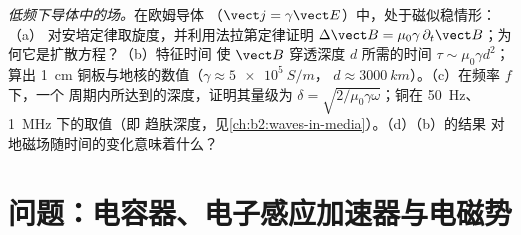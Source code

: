 \begin{exercise}[$\star\star\star$]\label{exo:b2:maxwell-equations:12}
\emph{低频下导体中的场。}在欧姆导体
（$\vect j = \gamma\vect E$）中，处于磁似稳情形：（a）
对安培定律取旋度，并利用法拉第定律证明 $\Delta\vect B = \mu_0\gamma\,
\partial_t\vect B$；为何它是扩散方程？（b）特征时间
使 $\vect B$ 穿透深度 $d$ 所需的时间 $\tau \sim \mu_0\gamma d^2$；算出
\qty{1}{cm} 铜板与地核的数值（$\gamma \approx \qty{5e5}{S/m}$，
$d \approx \qty{3000}{km}$）。（c）在频率 $f$ 下，一个
周期内所达到的深度，证明其量级为 $\delta = \sqrt{2/\mu_0\gamma\omega}$；铜在
\qty{50}{Hz}、\qty{1}{MHz} 下的取值（即
趋肤深度，见\cref{ch:b2:waves-in-media}）。（d）（b）的结果
对地磁场随时间的变化意味着什么？
\end{exercise}

\section{问题：电容器、电子感应加速器与电磁势}

